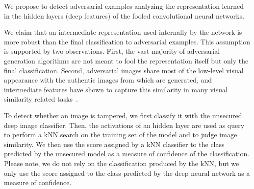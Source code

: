 
We propose to detect adversarial examples analyzing the representation learned in the hidden layers (deep features) of the fooled convolutional neural networks.

We claim that an intermediate representation used internally by the network is more robust than the final classification to adversarial examples.
This assumption is supported by two observations.
First, the vast majority of adversarial generation algorithms are not meant to fool the representation itself but only the final classification.
Second, adversarial images share most of the low-level visual appearance with the authentic images from which are generated, and intermediate features have shown to capture this similarity in many visual similarity related tasks~\cite{sharif2014cnn,gordo2016deep}.

To detect whether an image is tampered, we first classify it with the unsecured deep image classifier.
Then, the activations of an hidden layer are used as query to perform a kNN search on the training set of the model and to judge image similarity.
We then use the score assigned by a kNN classifier to the class predicted by the unsecured model as a measure of confidence of the classification.
Please note, we do not rely on the classification produced by the kNN, but we only use the score assigned to the class predicted by the deep neural network as a measure of confidence.

